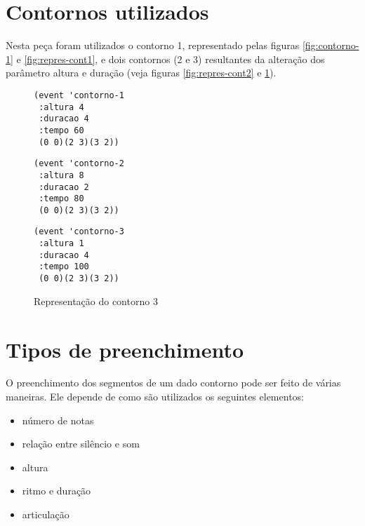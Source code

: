 \documentclass[12pt]{article}
\begin{document}
\section{Contornos utilizados}
\label{sec:contorno-utilizado}

Nesta peça foram utilizados o contorno 1, representado pelas figuras
\ref{fig:contorno-1} e \ref{fig:repres-cont1}, e dois contornos (2 e
3) resultantes da alteração dos parâmetro altura e duração (veja
figuras \ref{fig:repres-cont2} e \ref{fig:repres-cont3}).

\begin{figure}
\begin{minipage}{5cm}
  \centering
\begin{verbatim}
(event 'contorno-1
 :altura 4
 :duracao 4
 :tempo 60
 (0 0)(2 3)(3 2))
\end{verbatim}
  \caption{Representação do contorno 1}
  \label{fig:repres-cont1}
\end{minipage}
\hfill
\begin{minipage}{5cm}
  \centering
\begin{verbatim}
(event 'contorno-2
 :altura 8
 :duracao 2
 :tempo 80
 (0 0)(2 3)(3 2))
\end{verbatim}
  \caption{Representação do contorno 2}
  \label{fig:repres-cont2}
\end{minipage}
\hfill
\begin{minipage}{5cm}
  \centering
\begin{verbatim}
(event 'contorno-3
 :altura 1
 :duracao 4
 :tempo 100
 (0 0)(2 3)(3 2))
\end{verbatim}
  \caption{Representação do contorno 3}
  \label{fig:repres-cont3}
\end{minipage}
\hfill
\end{figure}

\section{Tipos de preenchimento}
\label{sec:tipos-de-preench}

O preenchimento dos segmentos de um dado contorno pode ser feito de
várias maneiras. Ele depende de como são utilizados os seguintes
elementos:

\begin{itemize}
\item número de notas
\item relação entre silêncio e som
\item altura
\item ritmo e duração
\item articulação
\end{itemize}
\end{document}
